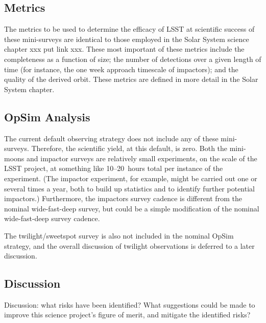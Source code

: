 
\subsection{Metrics}
\label{sec:keyword:metrics}

The metrics to be used to determine the efficacy of LSST
at scientific success of these mini-surveys are identical
to those employed in the Solar System science chapter
xxx put link xxx. These most important of these metrics
include the completeness as a function of size; the 
number of detections over a given length of time (for instance,
the one week approach timescale of impactors); and 
the quality of the derived orbit. These metrics are defined
in more detail in the Solar System chapter.



\subsection{OpSim Analysis}
\label{sec:keyword:analysis}

The current default observing strategy does not include
any of these mini-surveys. Therefore, the scientific yield,
at this default, is zero. Both the mini-moons and impactor
surveys are relatively small experiments, on the scale of 
the LSST project, at something like 10--20~hours total
per instance of the experiment. (The impactor experiment,
for example, might be carried out one or several times a year,
both to build up statistics and to identify further potential
impactors.) Furthermore, the impactors survey cadence
is different from the nominal wide-fast-deep survey,
but could be a simple modification of the nominal wide-fast-deep survey
cadence.

The twilight/sweetspot survey is also not included in
the nominal OpSim strategy, and the overall discussion
of twilight observations is deferred to a later discussion.



\subsection{Discussion}
\label{sec:keyword:discussion}

Discussion: what risks have been identified? What suggestions could be
made to improve this science project's figure of merit, and mitigate
the identified risks?



\navigationbar

